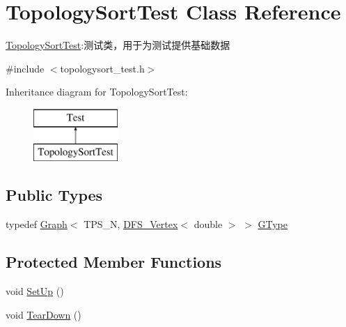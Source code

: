 \hypertarget{class_topology_sort_test}{}\section{Topology\+Sort\+Test Class Reference}
\label{class_topology_sort_test}


\hyperlink{class_topology_sort_test}{Topology\+Sort\+Test}\+:测试类，用于为测试提供基础数据  




{\ttfamily \#include $<$topologysort\+\_\+test.\+h$>$}

Inheritance diagram for Topology\+Sort\+Test\+:\begin{figure}[H]
\begin{center}
\leavevmode
\includegraphics[height=2.000000cm]{class_topology_sort_test}
\end{center}
\end{figure}
\subsection*{Public Types}
\begin{DoxyCompactItemize}
\item 
typedef \hyperlink{struct_introduction_to_algorithm_1_1_graph_algorithm_1_1_graph}{Graph}$<$ T\+P\+S\+\_\+\+N, \hyperlink{struct_introduction_to_algorithm_1_1_graph_algorithm_1_1_d_f_s___vertex}{D\+F\+S\+\_\+\+Vertex}$<$ double $>$ $>$ \hyperlink{class_topology_sort_test_aa530f6f774d1b97dbb3968d9e445ce21}{G\+Type}
\end{DoxyCompactItemize}
\subsection*{Protected Member Functions}
\begin{DoxyCompactItemize}
\item 
void \hyperlink{class_topology_sort_test_aa1b6dad41e9cbf8b6633a355ac743957}{Set\+Up} ()
\item 
void \hyperlink{class_topology_sort_test_a1195b18b412ae18f9011d4821b50eb1f}{Tear\+Down} ()
\end{DoxyCompactItemize}
